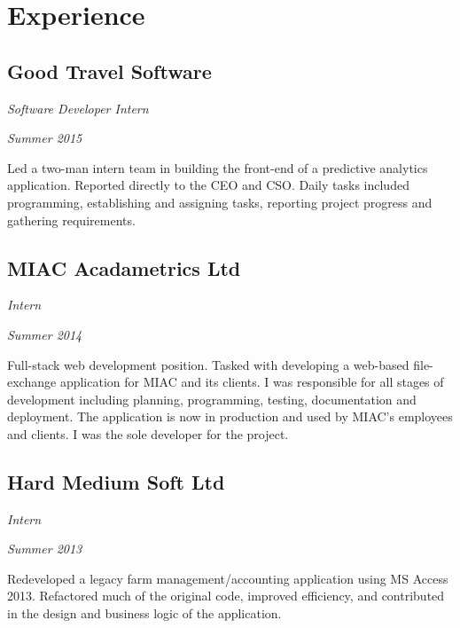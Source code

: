 \section*{Experience}

\subsection*{Good Travel Software}
\noindent\begin{minipage}[b]{0.5\textwidth}
  \flushleft
  \emph{Software Developer Intern}
\end{minipage}
\noindent\begin{minipage}[b]{0.5\textwidth}
  \flushright
  \emph{Summer 2015}
\end{minipage}
Led a two-man intern team in building the front-end of a predictive analytics application. Reported directly to the CEO and CSO. Daily tasks included programming, establishing and assigning tasks, reporting project progress and gathering requirements.

\subsection*{MIAC Acadametrics Ltd}
\noindent\begin{minipage}[b]{0.5\textwidth}
  \flushleft
  \emph{Intern}
\end{minipage}
\noindent\begin{minipage}[b]{0.5\textwidth}
  \flushright
  \emph{Summer 2014}
\end{minipage}
Full-stack web development position. Tasked with developing a web-based  file-exchange application for MIAC and its clients. I was responsible for all stages of development including planning, programming, testing, documentation and deployment. The application is now in production and used by MIAC's employees and clients. I was the sole developer for the project.

\subsection*{Hard Medium Soft Ltd}
\noindent\begin{minipage}[b]{0.5\textwidth}
  \flushleft
  \emph{Intern}
\end{minipage}
\noindent\begin{minipage}[b]{0.5\textwidth}
  \flushright
  \emph{Summer 2013}
\end{minipage}
Redeveloped a legacy farm management/accounting application using MS Access 2013. Refactored much of the original code, improved efficiency, and contributed in the design and business logic of the application.

